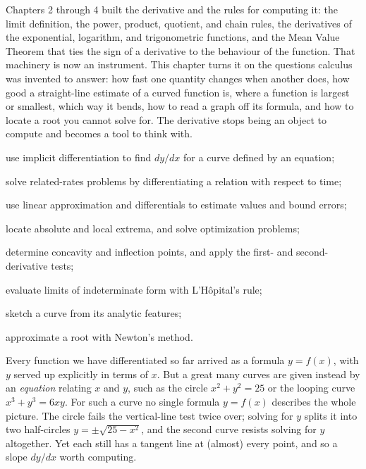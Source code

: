 \documentclass[a4paper,12pt,oneside]{memoir}
\begin{document}
\begin{lead}
Chapters 2 through 4 built the derivative and the rules for computing it: the limit definition, the power, product, quotient, and chain rules, the derivatives of the exponential, logarithm, and trigonometric functions, and the Mean Value Theorem that ties the sign of a derivative to the behaviour of the function. That machinery is now an instrument. This chapter turns it on the questions calculus was invented to answer: how fast one quantity changes when another does, how good a straight-line estimate of a curved function is, where a function is largest or smallest, which way it bends, how to read a graph off its formula, and how to locate a root you cannot solve for. The derivative stops being an object to compute and becomes a tool to think with.
\end{lead}
\begin{objectives}
  \item use implicit differentiation to find \(dy/dx\) for a curve defined by an equation;
  \item solve related-rates problems by differentiating a relation with respect to time;
  \item use linear approximation and differentials to estimate values and bound errors;
  \item locate absolute and local extrema, and solve optimization problems;
  \item determine concavity and inflection points, and apply the first- and second-derivative tests;
  \item evaluate limits of indeterminate form with L’Hôpital’s rule;
  \item sketch a curve from its analytic features;
  \item approximate a root with Newton’s method.
\end{objectives}
Every function we have differentiated so far arrived as a formula \(y = f(x)\), with \(y\) served up explicitly in terms of \(x\). But a great many curves are given instead by an \emph{equation} relating \(x\) and \(y\), such as the circle \(x^{2} + y^{2} = 25\) or the looping curve \(x^{3} + y^{3} = 6xy\). For such a curve no single formula \(y = f(x)\) describes the whole picture. The circle fails the vertical-line test twice over; solving for \(y\) splits it into two half-circles \(y = \pm\sqrt{25 - x^{2}}\), and the second curve resists solving for \(y\) altogether. Yet each still has a tangent line at (almost) every point, and so a slope \(dy/dx\) worth computing.
\end{document}
